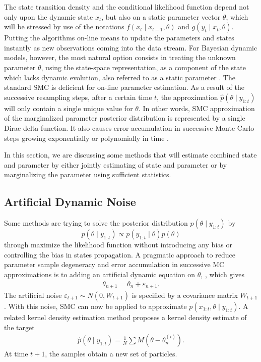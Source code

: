 The state transition density and the conditional likelihood function depend not only upon the dynamic state $x_t$, but also on a static parameter vector $\theta$, which will be stressed by use of the notations $f(x_t \mid x_{t-1},\theta)$ and $g(y_t\mid x_t,\theta)$. Putting the algorithms on-line means to update the parameters and states instantly as new observations coming into the data stream. For Bayesian dynamic models, however, the most natural option consists in treating the unknown parameter $\theta$, using the state-space representation, as a component of the state which lacks dynamic evolution, also referred to as a static parameter \citep{cappe2007overview}. The standard SMC is deficient for on-line parameter estimation. As a result of the successive resampling steps, after a certain time $t$, the approximation $\hat{p}(\theta\mid y_{1:t})$ will only contain a single unique value for $\theta$. In other words, SMC approximation of the marginalized parameter posterior distribution is represented by a single Dirac delta function. It also causes error accumulation in successive Monte Carlo steps growing exponentially or polynomially in time \citep{kantas2009overview}. 

In this section, we are discussing some methods that will estimate combined state and parameter by either jointly estimating of state and parameter or by marginalizing the parameter using sufficient statistics. 





\subsection{Artificial Dynamic Noise}\label{ArtificialNoise}

Some methods are trying to solve the posterior distribution $p(\theta \mid y_{1:t})$ by 
\begin{equation}
p(\theta \mid y_{1:t}) \propto p(y_{1:t} \mid \theta ) p(\theta )
\end{equation}
through maximize the likelihood function without introducing any bias or controlling the bias in states propagation. A pragmatic approach to reduce parameter sample degeneracy and error accumulation in successive MC approximations is to adding an artificial dynamic equation on $\theta$, \citep{higuchi2001self, kitagawa1998self}, which gives
\begin{align*}
\theta_{n+1} = \theta_n+\varepsilon_{n+1}.
\end{align*}
The artificial noise $\varepsilon_{t+1}\sim N(0,W_{t+1})$ is specified by a covariance matrix $W_{t+1}$. With this noise, SMC can now be applied to approximate $p(x_{1:t},\theta\mid y_{1:t})$. A related kernel density estimation method proposes a kernel density estimate of the target \citep{liu2001combined} 
\begin{align*}
\hat{p}(\theta\mid y_{1:t}) = \frac{1}{N}\sum M\left(\theta-\theta_n^{(i)}\right). 
\end{align*} 
At time $t+1$, the samples obtain a new set of particles. 


